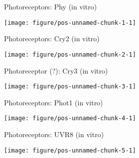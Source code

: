 \documentclass[10pt]{beamer}\usepackage[]{graphicx}\usepackage[]{color}
\newenvironment{knitrout}{}{} %
\begin{document}
\begin{frame}{Photoreceptors: Phy (in vitro)}
\begin{knitrout}\tiny
{}\color{fgcolor}

{\centering \texttt{[image: figure/pos-unnamed-chunk-1-1]} 

}


\end{knitrout}
\end{frame}

\begin{frame}{Photoreceptors: Cry2 (in vitro)}
\begin{knitrout}\tiny
{}\color{fgcolor}

{\centering \texttt{[image: figure/pos-unnamed-chunk-2-1]} 

}


\end{knitrout}
\end{frame}

\begin{frame}{Photoreceptor (?): Cry3 (in vitro)}
\begin{knitrout}\tiny
{}\color{fgcolor}

{\centering \texttt{[image: figure/pos-unnamed-chunk-3-1]} 

}


\end{knitrout}
\end{frame}

\begin{frame}{Photoreceptors: Phot1 (in vitro)}
\begin{knitrout}\tiny
{}\color{fgcolor}

{\centering \texttt{[image: figure/pos-unnamed-chunk-4-1]} 

}


\end{knitrout}
\end{frame}

\begin{frame}{Photoreceptors: UVR8 (in vitro)}
\begin{knitrout}\tiny
{}\color{fgcolor}

{\centering \texttt{[image: figure/pos-unnamed-chunk-5-1]} 

}


\end{knitrout}
\end{frame}
\end{document}
